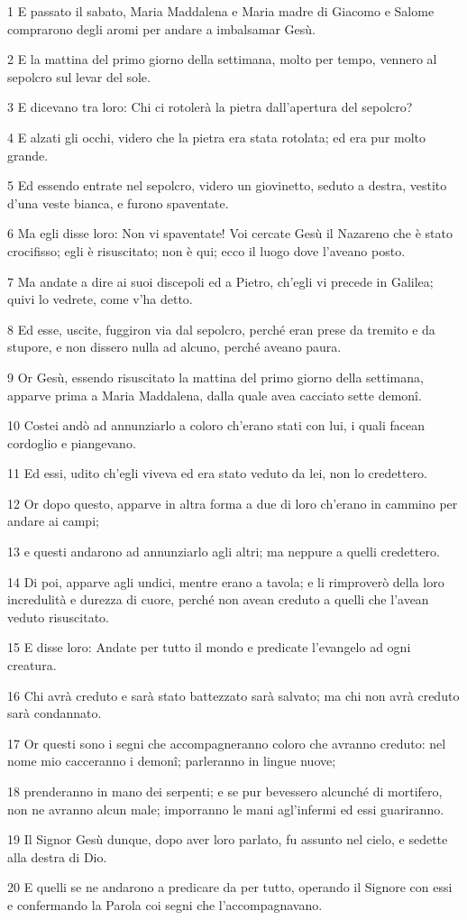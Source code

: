 \par 1 E passato il sabato, Maria Maddalena e Maria madre di Giacomo e Salome comprarono degli aromi per andare a imbalsamar Gesù.
\par 2 E la mattina del primo giorno della settimana, molto per tempo, vennero al sepolcro sul levar del sole.
\par 3 E dicevano tra loro: Chi ci rotolerà la pietra dall'apertura del sepolcro?
\par 4 E alzati gli occhi, videro che la pietra era stata rotolata; ed era pur molto grande.
\par 5 Ed essendo entrate nel sepolcro, videro un giovinetto, seduto a destra, vestito d'una veste bianca, e furono spaventate.
\par 6 Ma egli disse loro: Non vi spaventate! Voi cercate Gesù il Nazareno che è stato crocifisso; egli è risuscitato; non è qui; ecco il luogo dove l'aveano posto.
\par 7 Ma andate a dire ai suoi discepoli ed a Pietro, ch'egli vi precede in Galilea; quivi lo vedrete, come v'ha detto.
\par 8 Ed esse, uscite, fuggiron via dal sepolcro, perché eran prese da tremito e da stupore, e non dissero nulla ad alcuno, perché aveano paura.
\par 9 Or Gesù, essendo risuscitato la mattina del primo giorno della settimana, apparve prima a Maria Maddalena, dalla quale avea cacciato sette demonî.
\par 10 Costei andò ad annunziarlo a coloro ch'erano stati con lui, i quali facean cordoglio e piangevano.
\par 11 Ed essi, udito ch'egli viveva ed era stato veduto da lei, non lo credettero.
\par 12 Or dopo questo, apparve in altra forma a due di loro ch'erano in cammino per andare ai campi;
\par 13 e questi andarono ad annunziarlo agli altri; ma neppure a quelli credettero.
\par 14 Di poi, apparve agli undici, mentre erano a tavola; e li rimproverò della loro incredulità e durezza di cuore, perché non avean creduto a quelli che l'avean veduto risuscitato.
\par 15 E disse loro: Andate per tutto il mondo e predicate l'evangelo ad ogni creatura.
\par 16 Chi avrà creduto e sarà stato battezzato sarà salvato; ma chi non avrà creduto sarà condannato.
\par 17 Or questi sono i segni che accompagneranno coloro che avranno creduto: nel nome mio cacceranno i demonî; parleranno in lingue nuove;
\par 18 prenderanno in mano dei serpenti; e se pur bevessero alcunché di mortifero, non ne avranno alcun male; imporranno le mani agl'infermi ed essi guariranno.
\par 19 Il Signor Gesù dunque, dopo aver loro parlato, fu assunto nel cielo, e sedette alla destra di Dio.
\par 20 E quelli se ne andarono a predicare da per tutto, operando il Signore con essi e confermando la Parola coi segni che l'accompagnavano.


